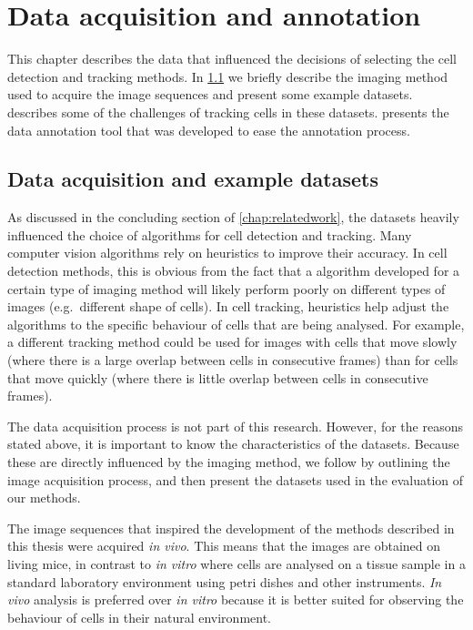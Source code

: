 \chapter{Data acquisition and annotation \statusfirstdraft}
	\label{chap:data}
	
	This chapter describes the data that influenced the decisions of selecting the cell detection and tracking methods. In \cref{sec:data_examples} we briefly describe the imaging method used to acquire the image sequences and present some example datasets.  describes some of the challenges of tracking cells in these datasets.  presents the data annotation tool that was developed to ease the annotation process.

    \section{Data acquisition and example datasets \statusseconddraft}
    \label{sec:data_examples}
    
    As discussed in the concluding section of \cref{chap:relatedwork}, the datasets heavily influenced the choice of algorithms for cell detection and tracking. Many computer vision algorithms rely on heuristics to improve their accuracy. In cell detection methods, this is obvious from the fact that a algorithm developed for a certain type of imaging method will likely perform poorly on different types of images (e.g.\ different shape of cells). In cell tracking, heuristics help adjust the algorithms to the specific behaviour of cells that are being analysed. For example, a different tracking method could be used for images with cells that move slowly (where there is a large overlap between cells in consecutive frames) than for cells that move quickly (where there is little overlap between cells in consecutive frames).
    
    The data acquisition process is not part of this research. However, for the reasons stated above, it is important to know the characteristics of the datasets. Because these are directly influenced by the imaging method, we follow by outlining the image acquisition process, and then present the datasets used in the evaluation of our methods.
    
    The image sequences that inspired the development of the methods described in this thesis were acquired \textit{in vivo}. This means that the images are obtained on living mice, in contrast to \textit{in vitro} where cells are analysed on a tissue sample in a standard laboratory environment using petri dishes and other instruments. \textit{In vivo} analysis is preferred over \textit{in vitro} because it is better suited for observing the behaviour of cells in their natural environment.
    
